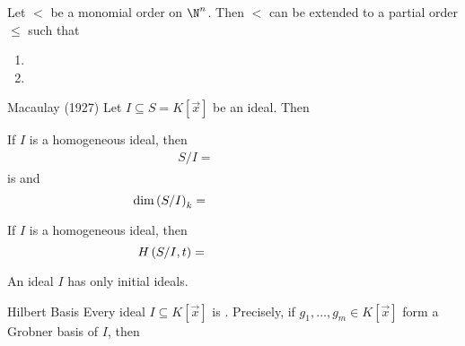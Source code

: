 \documentclass[11pt]{article}
\begin{document}
    \begin{prop}{}
        Let $<$ be a monomial order on $\N^n$. Then $<$ can be extended to a partial order $\leq$ such that
        \begin{enumerate}
            \item 
            \item 
        \end{enumerate}
    \end{prop}
    
    \rruleline

    \begin{theorem}{Macaulay (1927)}
        Let $I\subseteq S=K\left[ \vec{x} \right]$ be an ideal. Then 
    \end{theorem}

    \rruleline
    
    \begin{cor}{}
        If $I$ is a homogeneous ideal, then
        \begin{equation*}
            S /I = \phantom{\bigoplus^{\infty}_{k=0} S_k /I_k}
        \end{equation*}
        is \phantom{graded} and
        \begin{equation*}
            \dim\left( S /I \right)_k = \phantom{\dim\left( S /\initial\left( I \right) \right)_k}
        \end{equation*}
    \end{cor}	
    
    \rruleline
    
    \begin{cor}{}
        If $I$ is a homogeneous ideal, then
        \begin{equation*}
            H\left( S /I, t \right) = \phantom{H\left( S /\initial\left( I \right), t \right)}
        \end{equation*}
    \end{cor}	
    
    \rruleline
    
    \begin{theorem}{}
        An ideal $I$ has only \phantom{finitely many} initial ideals.
    \end{theorem}
    
    \begin{theorem}{Hilbert Basis}
        Every ideal $I\subseteq K\left[ \vec{x} \right]$ is \phantom{finitely generated}. Precisely, if $g_1,\ldots,g_m\in K\left[ \vec{x} \right]$ form a Grobner basis of $I$, then 
        \begin{equation*}
        \end{equation*}
    \end{theorem}
    
\end{document}
